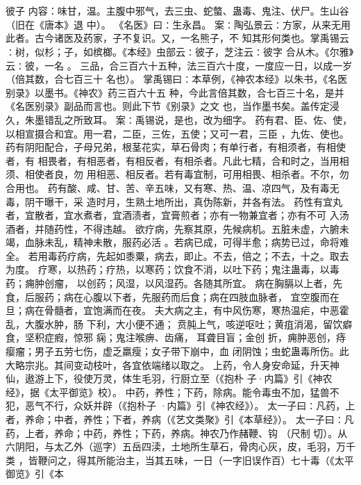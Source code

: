 \documentclass[12pt,UTF8]{ctexbook}
\begin{document}
\section{}彼子
内容：味甘，温。主腹中邪气，去三虫、蛇螫、蛊毒、鬼注、伏尸。生山谷（旧在《唐本》退 
中）。 
《名医》曰∶生永昌。 
案∶陶弘景云∶方家，从来无用此者。古今诸医及药家，子不复识。又，一名熊子，不 
知其形何类也。掌禹锡云∶树，似杉；子，如槟榔。《本经》虫部云∶彼子，芝注云∶彼字 
合从木。《尔雅》云∶彼，一名 。 
三品，合三百六十五种，法三百六十度，一度应一日，以成一岁（倍其数，合七百三十 
名也）。 
掌禹锡曰∶本草例，《神农本经》以朱书，《名医别录》以墨书。《神农》药三百六十五 
种，今此言倍其数，合七百三十名，是并《名医别录》副品而言也。则此下节《别录》之文 
也，当作墨书矣。盖传定浸久，朱墨错乱之所致耳。 
案∶禹锡说，是也，改为细字。 
药有君、臣、佐、使，以相宣摄合和宜。用一君，二臣，三佐，五使；又可一君，三臣 
，九佐、使也。 
药有阴阳配合，子母兄弟，根茎花实，草石骨肉；有单行者，有相须者，有相使者，有 
相畏者，有相恶者，有相反者，有相杀者。凡此七精，合和时之，当用相须、相使者良，勿 
用相恶、相反者。若有毒宜制，可用相畏、相杀者。不尔，勿合用也。 
药有酸、咸、甘、苦、辛五味，又有寒、热、温、凉四气，及有毒无毒，阴干曝干，采 
造时月，生熟土地所出，真伪陈新，并各有法。 
药性有宜丸者，宜散者，宜水煮者，宜酒渍者，宜膏煎者；亦有一物兼宜者；亦有不可 
入汤酒者，并随药性，不得违越。 
欲疗病，先察其原，先候病机。五脏未虚，六腑未竭，血脉未乱，精神未散，服药必活 
。若病已成，可得半愈；病势已过，命将难全。 
若用毒药疗病，先起如黍粟，病去，即止。不去，倍之；不去，十之。取去为度。 
疗寒，以热药；疗热，以寒药；饮食不消，以吐下药；鬼注蛊毒，以毒药；痈肿创瘤， 
以创药；风湿，以风湿药。各随其所宜。 
病在胸膈以上者，先食，后服药；病在心腹以下者，先服药而后食；病在四肢血脉者， 
宜空腹而在旦；病在骨髓者，宜饱满而在夜。 
夫大病之主，有中风伤寒，寒热温疟，中恶霍乱，大腹水肿，肠 下利，大小便不通； 
贲肫上气，咳逆呕吐；黄疽消渴，留饮癖食，坚积症瘕，惊邪 痫；鬼注喉痹、齿痛， 
耳聋目盲；金创 折，痈肿恶创，痔 瘿瘤；男子五劳七伤，虚乏羸瘦；女子带下崩中，血 
闭阴蚀；虫蛇蛊毒所伤。此大略宗兆。其间变动枝叶，各宜依端绪以取之。 
上药，令人身安命延，升天神仙，遨游上下，役使万灵，体生毛羽，行厨立至（《抱朴 
子·内篇》引《神农经》，据《太平御览》校）。 
中药，养性；下药，除病。能令毒虫不加，猛兽不犯，恶气不行，众妖并辟（《抱朴子 
·内篇》引《神农经》）。 
太一子曰∶凡药，上者，养命；中者，养性；下者，养病（《艺文类聚》引《本草经》）。 
太一子曰∶凡药，上者，养命；中药，养性；下药，养病。神农乃作赭鞭、钩 （尺制 
切）。从六阴阳，与太乙外（巡字）五岳四渎，土地所生草石，骨肉心灰，皮，毛羽，万千 
类 
，皆鞭问之，得其所能治主，当其五味，一日（一字旧误作百）七十毒（《太平御览》引《本 
\end{document}
